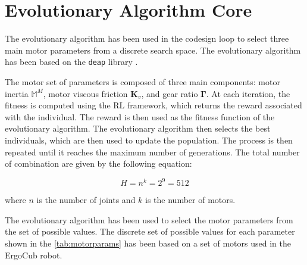 \section{Evolutionary Algorithm Core}
\label{sec:EvolutionAlgo}

The evolutionary algorithm has been used in the codesign loop to select three main motor parameters from a discrete search space. The evolutionary algorithm has been based on the \texttt{deap} library \citep{DEAP_JMLR2012}.

The motor set of parameters is composed of three main components: motor inertia $\mathbb{M}^M$, motor viscous friction $\mathbf{K}_v$, and gear ratio $\boldsymbol{\Gamma}$. At each iteration, the fitness is computed using the \ac{RL} framework, which returns the reward associated with the individual. The reward is then used as the fitness function of the evolutionary algorithm. The evolutionary algorithm then selects the best individuals, which are then used to update the population. The process is then repeated until it reaches the maximum number of generations. The total number of combination are given by the following equation:

\begin{equation}
    H = n^k = 2^9 = 512
\end{equation}

where $n$ is the number of joints and $k$ is the number of motors.

The evolutionary algorithm has been used to select the motor parameters from the set of possible values. The discrete set of possible values for each parameter shown in the \cref{tab:motorparams} has been based on a set of motors used in the ErgoCub robot.

